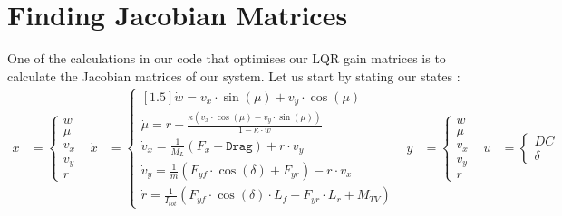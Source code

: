 \documentclass[a4paper, 11pt]{article}
\begin{document}
\section{Finding Jacobian Matrices}

One of the calculations in our code that optimises our LQR gain matrices is to calculate the Jacobian matrices of our system. Let us start by stating our states :
\begin{align*}
	x &= \left\{ \begin{matrix}
		w\\ \mu \\ v_x\\ v_y\\ r
	\end{matrix} \right. & \dot{x} &= \left\{\begin{matrix}[1.5]
		\dot{w} = v_x\cdot\sin\left(\mu \right) + v_y\cdot \cos\left(\mu \right)\\
		\dot{\mu} = r - \frac{\kappa\left(v_x\cdot\cos\left(\mu \right) - v_y\cdot \sin\left(\mu \right) \right)}{1-\kappa\cdot w} \\
		\dot{v}_x = \frac{1}{M_L}\left(F_x - \texttt{Drag} \right) + r\cdot v_y\\
		\dot{v}_y = \frac{1}{m}\left(F_{yf}\cdot \cos\left(\delta \right) + F_{yr} \right) - r\cdot v_x\\
		\dot{r} = \frac{1}{I_{tot}} \left(F_{yf}\cdot\cos\left(\delta \right)\cdot L_f - F_{yr}\cdot L_r + M_{TV} \right)
	\end{matrix} \right. & y&=\left\{\begin{matrix}
		w\\ \mu \\ v_x\\ v_y\\ r
	\end{matrix}\right. & u&=\left\{\begin{matrix}
		DC\\ \delta
	\end{matrix} \right.
\end{align*}
\end{document}
